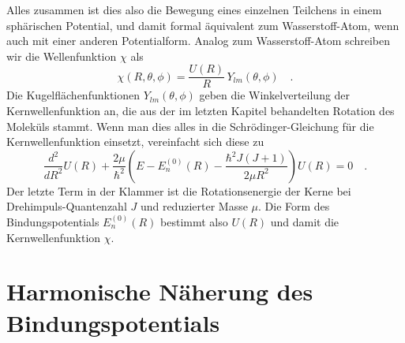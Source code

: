 Alles zusammen ist dies also die Bewegung eines einzelnen Teilchens in einem sphärischen Potential, und damit formal äquivalent zum Wasserstoff-Atom, wenn auch mit einer anderen Potentialform. Analog zum Wasserstoff-Atom schreiben wir die Wellenfunktion $\chi$ als
\begin{equation}
 \chi (R, \theta, \phi) = \frac{U(R)}{R} \, Y_{l m} (\theta, \phi) \quad .
\end{equation}
Die Kugelflächenfunktionen $ Y_{l m} (\theta, \phi)$ geben die Winkelverteilung der Kernwellenfunktion an, die aus der im letzten Kapitel behandelten Rotation des Moleküls stammt. Wenn man dies alles in die Schrödinger-Gleichung für die Kernwellenfunktion einsetzt, vereinfacht sich diese zu
\begin{equation}
 \frac{d^2}{d R^2} U(R) + \frac{2 \mu }{\hbar^2} \left( E - E_n^{(0)}(R) - \frac{\hbar^2 J (J+1)}{2 \mu R^2} \right) U(R) = 0 \quad .
 \label{eq:vib_zweiatom_U}
\end{equation}
Der letzte Term in der Klammer ist die Rotationsenergie der Kerne bei  Drehimpuls-Quantenzahl $J$ und reduzierter Masse $\mu$. Die Form des Bindungspotentials $E_n^{(0)}(R)$ bestimmt also $U(R)$ und damit die Kernwellenfunktion $\chi$.


\section{Harmonische Näherung des Bindungspotentials}

